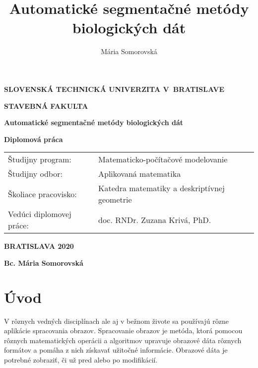 \documentclass[a4paper,11pt,twoside]{article}%
\author{Mária Somorovská}
\title{Automatické segmentačné metódy biologických dát}
\begin{document}
\setlength{\belowdisplayskip}{7pt} \setlength{\belowdisplayshortskip}{5pt}
\setlength{\abovedisplayskip}{7pt} \setlength{\abovedisplayshortskip}{5pt}

    \thispagestyle{empty}
    {
    \topmargin=0pt
    \centerline {\large \bf{SLOVENSKÁ TECHNICKÁ UNIVERZITA V~BRATISLAVE}}
    \vskip 0.2cm
    \centerline{\large \bf{STAVEBNÁ FAKULTA}}
    \vskip 7cm
    \centerline{\Large \bf{Automatické segmentačné metódy biologických dát}}
    \vskip 0.2cm
    \vskip 0.5cm
    \centerline{\large \bf{Diplomová práca}}
    \vskip 5cm          %
    \normalsize
        \begin{tabular}[l]{p{}p{}}
        Študijny program: & Matematicko-počítačové modelovanie\\
        Študijny odbor: & Aplikovaná matematika\\
        Školiace pracovisko: & Katedra matematiky a deskriptívnej geometrie\\
        Vedúci diplomovej práce: & doc. RNDr. Zuzana Krivá, PhD. \\
        \end{tabular}
    \vskip 1.5cm
    \centerline{\large \bf{BRATISLAVA 2020}}
    \vskip 0.2cm
    \centerline{\large \bf{Bc. Mária Somorovská}}
    }
\pagebreak

\tableofcontents

\newpage

\section{Úvod}



V rôznych vedných disciplínach ale aj v bežnom živote sa používajú rôzne aplikácie spracovania obrazov. Spracovanie obrazov je metóda, ktorá pomocou rôznych matematických operácii a algoritmov upravuje obrazové dáta rôznych formátov a pomáha z nich získavať užitočné informácie.  Obrazové dáta je potrebné zobraziť, či už pred alebo po modifikácií. 
\end{document}
